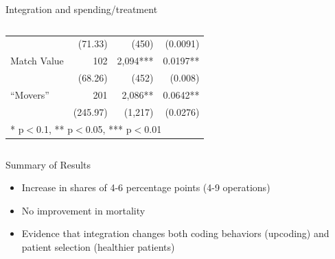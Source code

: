 \documentclass[t]{beamer}
\begin{document}
\begin{frame}{Integration and spending/treatment}
{\begin{columns}
\begin{column}{.6\textwidth}
\begin{table}[htb!]
{\begin{tabular}{l|rrr}
                           &   (71.33)   &   (450)    &    (0.0091) \\
                Match Value &    102   &   2,094***  &    0.0197**   \\
                            &   (68.26)   &   (452)    &     (0.008) \\
                ``Movers''  &    201   &   2,086**  &    0.0642**   \\
                            &   (245.97)  &   (1,217)  &    (0.0276)   \\
                \hline
                \multicolumn{4}{l}{* p$<$0.1, ** p$<$0.05, *** p$<$0.01}
            \end{tabular}}
            \end{table}
        \end{column}
    \end{columns}
    }
\end{frame}

\begin{frame}{Summary of Results}
    \begin{itemize}
        \item<1-> Increase in shares of 4-6 percentage points (4-9 operations)
        \item<2-> No improvement in mortality
        \item<3-> Evidence that integration changes both coding behaviors (upcoding) and patient selection (healthier patients)
    \end{itemize}
\end{frame}
\end{document}
